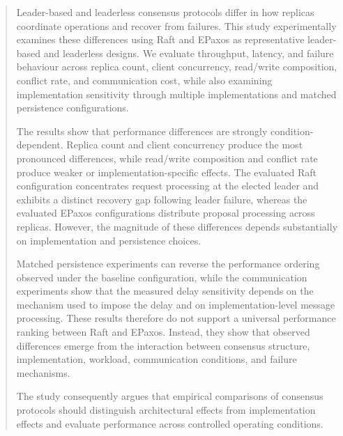 \begin{abstract}

Leader-based and leaderless consensus protocols differ in how replicas
coordinate operations and recover from failures. This study experimentally
examines these differences using Raft and EPaxos as representative
leader-based and leaderless designs. We evaluate throughput, latency, and
failure behaviour across replica count, client concurrency, read/write
composition, conflict rate, and communication cost, while also examining
implementation sensitivity through multiple implementations and matched
persistence configurations.

The results show that performance differences are strongly
condition-dependent. Replica count and client concurrency produce the most
pronounced differences, while read/write composition and conflict rate
produce weaker or implementation-specific effects. The evaluated Raft
configuration concentrates request processing at the elected leader and
exhibits a distinct recovery gap following leader failure, whereas the
evaluated EPaxos configurations distribute proposal processing across
replicas. However, the magnitude of these differences depends substantially
on implementation and persistence choices.

Matched persistence experiments can reverse the performance ordering
observed under the baseline configuration, while the communication
experiments show that the measured delay sensitivity depends on the
mechanism used to impose the delay and on implementation-level message
processing. These results therefore do not
support a universal performance ranking between Raft and EPaxos. Instead,
they show that observed differences emerge from the interaction between
consensus structure, implementation, workload, communication conditions,
and failure mechanisms.

The study consequently argues that empirical comparisons of consensus
protocols should distinguish architectural effects from implementation
effects and evaluate performance across controlled operating conditions.
\end{abstract}
